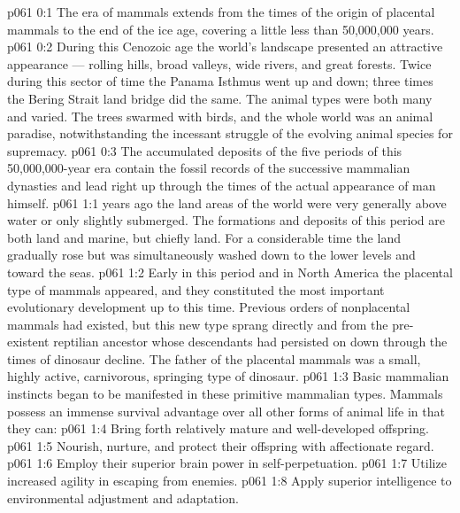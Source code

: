 \author{Life Carrier}
\vs p061 0:1 The era of mammals extends from the times of the origin of placental mammals to the end of the ice age, covering a little less than 50,000,000 years.
\vs p061 0:2 During this Cenozoic age the world’s landscape presented an attractive appearance --- rolling hills, broad valleys, wide rivers, and great forests. Twice during this sector of time the Panama Isthmus went up and down; three times the Bering Strait land bridge did the same. The animal types were both many and varied. The trees swarmed with birds, and the whole world was an animal paradise, notwithstanding the incessant struggle of the evolving animal species for supremacy.
\vs p061 0:3 The accumulated deposits of the five periods of this 50,000,000\hyp{}year era contain the fossil records of the successive mammalian dynasties and lead right up through the times of the actual appearance of man himself.
\vs p061 1:1  years ago the land areas of the world were very generally above water or only slightly submerged. The formations and deposits of this period are both land and marine, but chiefly land. For a considerable time the land gradually rose but was simultaneously washed down to the lower levels and toward the seas.
\vs p061 1:2 Early in this period and in North America the placental type of mammals  appeared, and they constituted the most important evolutionary development up to this time. Previous orders of nonplacental mammals had existed, but this new type sprang directly and  from the pre\hyp{}existent reptilian ancestor whose descendants had persisted on down through the times of dinosaur decline. The father of the placental mammals was a small, highly active, carnivorous, springing type of dinosaur.
\vs p061 1:3 Basic mammalian instincts began to be manifested in these primitive mammalian types. Mammals possess an immense survival advantage over all other forms of animal life in that they can:
\vs p061 1:4 \bibnobreakspace Bring forth relatively mature and well\hyp{}developed offspring.
\vs p061 1:5 \bibnobreakspace Nourish, nurture, and protect their offspring with affectionate regard.
\vs p061 1:6 \bibnobreakspace Employ their superior brain power in self\hyp{}perpetuation.
\vs p061 1:7 \bibnobreakspace Utilize increased agility in escaping from enemies.
\vs p061 1:8 \bibnobreakspace Apply superior intelligence to environmental adjustment and adaptation.
